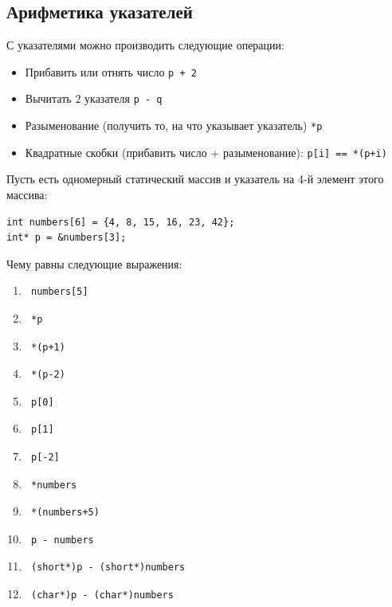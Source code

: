 \documentclass{article}
\begin{document}
\subsection*{Арифметика указателей}
С указателями можно производить следующие операции:
\begin{itemize}
\item Прибавить или отнять число          \quad             \texttt{p + 2}
\item Вычитать 2 указателя                      \quad       \texttt{p - q}
\item Разыменование (получить то, на что указывает указатель) \quad  \texttt{*p}
\item Квадратные скобки (прибавить число + разыменование): \quad \texttt{p[i] == *(p+i)}
\end{itemize}
Пусть есть одномерный статический массив и указатель на 4-й элемент этого массива:
\begin{lstlisting}
int numbers[6] = {4, 8, 15, 16, 23, 42};
int* p = &numbers[3];
\end{lstlisting}
Чему равны следующие выражения:
\begin{multicols}{3}
\begin{enumerate}
\item \begin{verbatim} numbers[5] \end{verbatim}
\item \begin{verbatim} *p \end{verbatim}
\item \begin{verbatim} *(p+1) \end{verbatim}
\item \begin{verbatim} *(p-2) \end{verbatim}
\item \begin{verbatim} p[0] \end{verbatim}
\item \begin{verbatim} p[1] \end{verbatim}
\item \begin{verbatim} p[-2] \end{verbatim}
\item \begin{verbatim} *numbers \end{verbatim}
\item \begin{verbatim} *(numbers+5) \end{verbatim}
\item \begin{verbatim} p - numbers \end{verbatim}
\item \begin{verbatim} (short*)p - (short*)numbers \end{verbatim}
\item \begin{verbatim} (char*)p - (char*)numbers \end{verbatim}
\end{enumerate}
\end{multicols}
\end{document}
